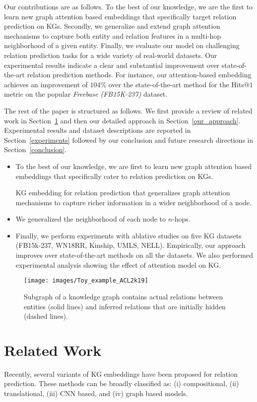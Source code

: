 \documentclass[11pt,a4paper]{article}
\begin{document}
Our contributions are as follows.
To the best of our knowledge, we are the first to learn new graph attention based embeddings that specifically target relation prediction on KGs. Secondly, we generalize and extend graph attention mechanisms to capture both entity and relation features in a multi-hop neighborhood of a given entity. Finally, we evaluate our model on challenging relation prediction tasks for a wide variety of real-world datasets. Our experimental results indicate a clear and substantial improvement over state-of-the-art relation prediction methods.
For instance, our attention-based embedding achieves an improvement of $104 \%$ over the state-of-the-art method for the Hits@$1$ metric on the popular \emph{Freebase (FB15K-237)} dataset. 

The rest of the paper is structured as follows. We first provide a review of related work in Section~\ref{related_work} and then our detailed approach in Section~\ref{our_approach}. Experimental results and dataset descriptions are reported in 
Section~\ref{experiments} followed by our conclusion and future research directions in Section~\ref{conclusion}.
\begin{itemize}
	\item To the best of our knowledge, we are first to learn new graph attention based embeddings that specifically cater to relation prediction on KGs.
	
	KG embedding for relation prediction that generalizes graph attention mechanisms to capture richer information in a wider neighborhood of a node. 
	
	\item We generalized the neighborhood of each node to $n$-hops. 
	\item Finally, we perform experiments with ablative studies on five KG datasets (FB15k-237, WN18RR, Kinship, UMLS, NELL). Empirically, our approach improves over state-of-the-art methods on all the datasets. We also performed experimental analysis showing the 
	effect of attention model on KG.
\end{itemize}
\fi

\begin{figure}
	\texttt{[image: images/Toy\_example\_ACL2k19]}
	\caption{Subgraph of a knowledge graph contains actual relations between entities (solid lines) and inferred relations that are initially hidden (dashed lines).}
	\label{fig:toys}
\end{figure}

\section{Related Work}\label{related_work}
Recently, several variants of KG embeddings have been proposed for relation prediction.
These methods can be broadly classified as: (i) compositional, (ii) translational, 
(iii) CNN based, and (iv) graph based models. 
\end{document}
